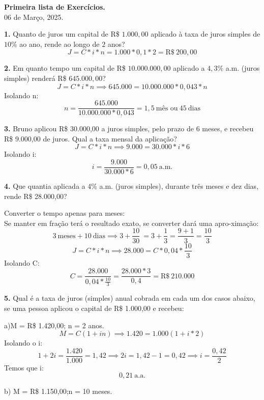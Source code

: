 \documentclass[12pt,a4paper]{article}
\begin{document}
  \begin{center}
    \textbf{Primeira lista de Exercícios.}\\
    06 de Março, 2025.
  \end{center}
  \vspace*{.5cm}

  \textbf{1.} Quanto de juros um capital de R\$ $1.000,00 $ aplicado à taxa de
  juros simples de $10\%$ ao ano, rende ao longo de $2$ anos?
  \[
    J = C * i * n = 1.000 * 0,1 * 2 = \text{R\$}\ 200,00 
  \]

  \textbf{2.} Em quanto tempo um capital de R\$ $10.000.000,00$ aplicado a $4,3\%$ a.m. (juros
  simples) renderá R\$ $645.000,00$?
  \[
    J = C * i * n \implies 645.000 = 10.000.000 * 0,043 * n 
  \]
  Isolando n:
  \[
    n = \frac{645.000}{10.000.000 * 0,043} = 1,5\ \text{mês ou}\ 45\ \text{dias}
  \]
  
  \textbf{3.} Bruno aplicou R\$ 30.000,00 a juros simples, pelo prazo de 6 meses, e recebeu R\$
  9.000,00 de juros. Qual a taxa mensal da aplicação?
  \[
    J = C*i*n \implies 9.000 = 30.000*i*6
  \]
  Isolando i:
  \[
    i = \frac{9.000}{30.000*6} = 0,05\ \text{a.m.}
  \]
  
  \textbf{4.} Que quantia aplicada a 4\% a.m. (juros simples), durante três meses e dez dias,
  rende R\$ 28.000,00?

  Converter o tempo apenas para meses:\\
  Se manter em fração terá o resultado exato, se converter dará uma apro-ximação:
  \[
    3\ \text{meses}  + 10\ \text{dias} \implies 3 + \frac{10}{30}\ = 3 + \frac{1}{3} = \frac{9 + 1}{3} = \frac{10}{3}
  \]
  \[
    J = C*i*n \implies 28.000 = C*0,04*\frac{10}{3}
  \]
  Isolando C:
  \[
    C = \frac{28.000}{0,04*\frac{10}{3}} = \frac{28.000 * 3}{0,4} = \text{R\$}\ 210.000
  \]

  \newpage
  \textbf{5.} Qual é a taxa de juros (simples) anual cobrada em cada um dos casos abaixo, se
  uma pessoa aplicou o capital de R\$ 1.000,00 e recebeu:
  \vspace*{.5cm}

  \hspace*{.5cm} a)M = R\$ 1.420,00; n = 2 anos.
  \[
    M = C(1 + in) \implies 1.420 = 1.000(1 + i*2)
  \]
  Isolando o i:
  \[
    1 + 2i = \frac{1.420}{1.000} = 1,42 \implies 2i = 1,42 - 1 = 0,42 \implies i = \frac{0,42}{2}
  \]
  Temos que i:
  \[
   0,21\ \text{a.a.}
  \]

  \hspace*{.5cm} b) M = R\$ 1.150,00;n = 10 meses.
\end{document}
